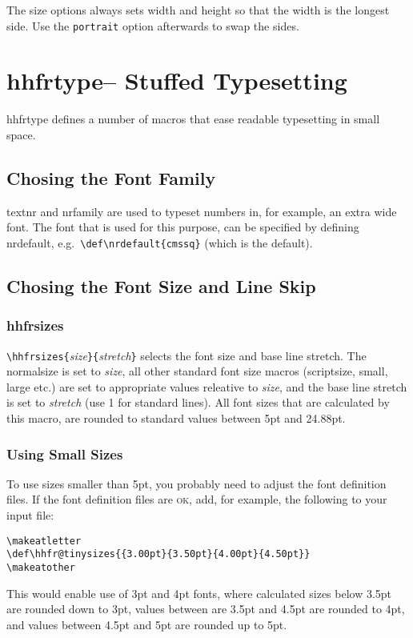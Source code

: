 \documentclass[11pt]{article}
\makeatletter
\def\packagename#1{{\sffamily #1}}     %
\def\macroname#1{{\ttfamily\@ttbs#1}}  %
\def\hhfrtype{\packagename{hhfrtype}\xspace}
\def\={\verb=}
\def\<#1>{\macroname{#1}}
\makeatother
\begin{document}
The size options always sets width and height so that the width is the
longest side. Use the \texttt{portrait} option afterwards to swap
the sides.

\section{\hhfrtype -- Stuffed Typesetting}

\hhfrtype defines a number of macros that ease readable typesetting
in small space.

\subsection{Chosing the Font Family}

\<textnr> and \<nrfamily> are used to typeset numbers in, for example,
an extra wide font. The font that is used for this purpose,
can be specified by defining \<nrdefault>, e.g.\ \=\def\nrdefault{cmssq}=
(which is the default).

\subsection{Chosing the Font Size and Line Skip}

\subsubsection{\<hhfrsizes>}
\=\hhfrsizes{=\textit{size}\=}{=\textit{stretch}\=}=
selects the font size and base line stretch. The
\<normalsize> is set to \textit{size}, all other standard
font size macros (\<scriptsize>, \<small>, \<large> etc.) are set
to appropriate values releative to \textit{size}, and the
base line stretch is set to \textit{stretch} (use 1 for standard lines).
All font sizes that are calculated by this macro, are rounded
to standard values between 5pt and 24.88pt.

\subsubsection{Using Small Sizes}
To use sizes smaller than 5pt, you probably need to adjust the
font definition files. If the font definition files are \textsc{ok},
add, for example, the following to your input file:
\begin{verbatim}
\makeatletter
\def\hhfr@tinysizes{{3.00pt}{3.50pt}{4.00pt}{4.50pt}}
\makeatother
\end{verbatim}
This would enable use of 3pt and 4pt fonts, where calculated
sizes below 3.5pt are rounded down to 3pt, values between are
3.5pt and 4.5pt are rounded to 4pt, and values between 4.5pt
and 5pt are rounded up to 5pt.
\end{document}
